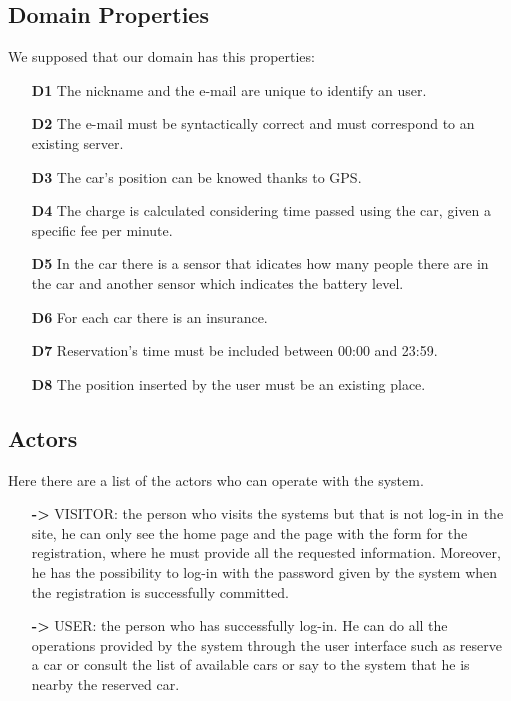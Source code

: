 \subsection{Domain Properties} \label{subsec:domain}
We supposed that our domain has this properties:
\begin{itemize}
\item[\textbf{D1}]The nickname and the e-mail are unique to identify an user.
\item[\textbf{D2}]The e-mail must be syntactically correct and must correspond to an existing server.
\item[\textbf{D3}]The car's position can be knowed thanks to GPS.
\item[\textbf{D4}]The charge is calculated considering time passed using the car, given a specific fee per minute.
\item[\textbf{D5}]In the car there is a sensor that idicates how many people there are in the car and another sensor which indicates the battery level.
\item[\textbf{D6}]For each car there is an insurance.
\item[\textbf{D7}]Reservation's time must be included between 00:00 and 23:59.
\item[\textbf{D8}]The position inserted by the user must be an existing place.
\end{itemize}


\subsection{Actors} \label{subsec:actors}
Here there are a list of the actors who can operate with the system.
\begin{itemize}
\item[\textbf{->}] VISITOR: the person who visits the systems but that is not log-in in the site, he can only see the home page and the page with the form for the registration, where he must provide all the requested information. Moreover, he has the possibility to log-in with the password given by the system when the registration is successfully committed. 
\item[\textbf{->}] USER: the person who has successfully log-in. He can do all the operations provided by the system through the user interface such as reserve a car or consult the list of available cars or say to the system that he is nearby the reserved car. 
\end{itemize}

